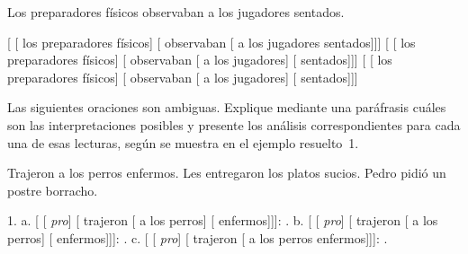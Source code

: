 \begin{exe}
  \ex\label{ex:09-sentados} Los preparadores físicos observaban a los jugadores
      sentados.
    \begin{xlist}
      \ex\label{ex:09-sentados-a} {}[ [ los preparadores
          físicos] [ observaban [ a los jugadores
          sentados]]]
      \ex\label{ex:09-sentados-b} {}[ [ los preparadores
          físicos] [ observaban [ a los jugadores]
          [ sentados]]]
      \ex\label{ex:09-sentados-c} {}[ [ los preparadores
          físicos] [ observaban [ a los jugadores]
          [ sentados]]]
    \end{xlist}
\end{exe}

\begin{ejercicio}\label{ej:09-ambiguas}
Las siguientes oraciones son ambiguas. Explique mediante una paráfrasis cuáles
son las interpretaciones posibles y presente los análisis correspondientes para
cada una de esas lecturas, según se muestra en el ejemplo resuelto~1.

\begin{exe}
  \ex Trajeron a los perros enfermos.
  \ex Les entregaron los platos sucios.
  \ex Pedro pidió un postre borracho.
\end{exe}

\begin{resuelto}
1. a. [ [ \textit{pro}] [
trajeron [ a los perros]
[ enfermos]]]: . b. [ [ \textit{pro}] [
trajeron [ a los perros]
[ enfermos]]]: . c. [ [ \textit{pro}]
[ trajeron [ a los
perros enfermos]]]: .
\end{resuelto}
\end{ejercicio}

